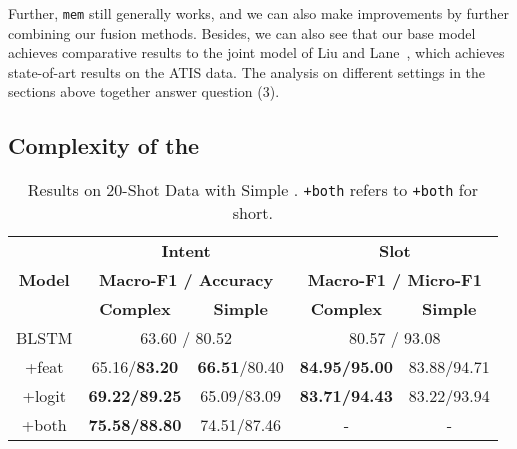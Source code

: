 Further, \texttt{mem} still generally works, and we can also make improvements by further combining our fusion methods.
Besides, we can also see that our base model achieves comparative results to the joint model of  Liu and Lane~, which achieves state-of-art results on the ATIS data.
The analysis on different settings in the sections above together answer question (3).

\subsection{Complexity of the \RE}
\label{sec_complexity}
\begin{table}
\setlength{\tabcolsep}{0.23em}
\centering
\small{
\begin{tabular}{|c|c|c|c|c|}

\hline
\multirow{3}{*}{\textbf{Model}}  & \multicolumn{2}{|c|}{\textbf{Intent}} & \multicolumn{2}{|c|}{\textbf{Slot}}  \\
\cline{2-5}
  & \multicolumn{2}{|c|}{\textbf{Macro-F1 / Accuracy}} & \multicolumn{2}{|c|}{\textbf{Macro-F1 / Micro-F1}}  \\
\cline{2-5}
  & \textbf{Complex} & \textbf{Simple} & \textbf{Complex} & \textbf{Simple} \\
\hline
\rowcolor{Gray} BLSTM & \multicolumn{2}{|c|}{63.60 / 80.52} & \multicolumn{2}{|c|}{80.57 / 93.08}  \\
\hline
+feat & 65.16/\textbf{83.20} & \textbf{66.51}/80.40 & \textbf{84.95/95.00} & 83.88/94.71 \\
\hline
\rowcolor{Gray} +logit & \textbf{69.22/89.25} & 65.09/83.09 & \textbf{83.71/94.43} & 83.22/93.94  \\
\hline
+both & \textbf{75.58/88.80} & 74.51/87.46 & - & - \\
\hline
\end{tabular}
}
\caption{Results on 20-Shot Data with Simple \REs. \texttt{+both} refers to \ptatt\texttt{+both} for short.}
\label{tab_simple}
\end{table}

